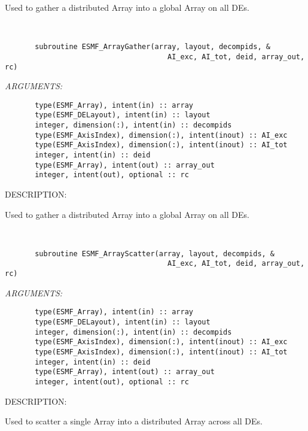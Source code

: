    Used to gather a distributed Array into a global Array on all DEs.
  
   
 
\mbox{}\hrulefill\ 
 

\begin{verbatim}       subroutine ESMF_ArrayGather(array, layout, decompids, &
                                      AI_exc, AI_tot, deid, array_out, rc)\end{verbatim}{\em ARGUMENTS:}
\begin{verbatim}       type(ESMF_Array), intent(in) :: array
       type(ESMF_DELayout), intent(in) :: layout
       integer, dimension(:), intent(in) :: decompids
       type(ESMF_AxisIndex), dimension(:), intent(inout) :: AI_exc
       type(ESMF_AxisIndex), dimension(:), intent(inout) :: AI_tot
       integer, intent(in) :: deid
       type(ESMF_Array), intent(out) :: array_out
       integer, intent(out), optional :: rc\end{verbatim}
{\sf DESCRIPTION:\\ }


   Used to gather a distributed Array into a global Array on all DEs.
  
   
 
\mbox{}\hrulefill\ 
 

\begin{verbatim}       subroutine ESMF_ArrayScatter(array, layout, decompids, &
                                      AI_exc, AI_tot, deid, array_out, rc)\end{verbatim}{\em ARGUMENTS:}
\begin{verbatim}       type(ESMF_Array), intent(in) :: array
       type(ESMF_DELayout), intent(in) :: layout
       integer, dimension(:), intent(in) :: decompids
       type(ESMF_AxisIndex), dimension(:), intent(inout) :: AI_exc
       type(ESMF_AxisIndex), dimension(:), intent(inout) :: AI_tot
       integer, intent(in) :: deid
       type(ESMF_Array), intent(out) :: array_out
       integer, intent(out), optional :: rc\end{verbatim}
{\sf DESCRIPTION:\\ }


   Used to scatter a single Array into a distributed Array across all DEs.
  
   
 
